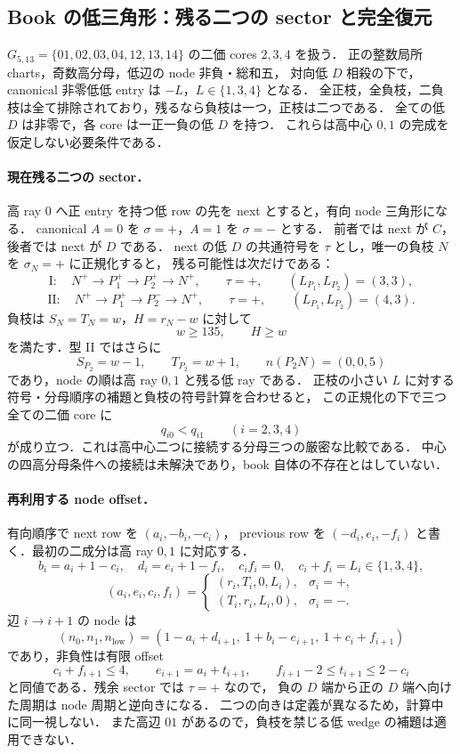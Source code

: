 \subsection{Book の低三角形：残る二つの sector と完全復元}
\label{nb20:section}
\label{nb21:section}

$G_{5,13}=\{01,02,03,04,12,13,14\}$ の二価 cores $2,3,4$ を扱う．
正の整数局所 charts，奇数高分母，低辺の node 非負・総和五，
対向低 $D$ 相殺の下で，canonical 非零低低 entry は $-L$，$L\in\{1,3,4\}$ となる．
全正枝，全負枝，二負枝は全て排除されており，残るなら負枝は一つ，正枝は二つである．
全ての低 $D$ は非零で，各 core は一正一負の低 $D$ を持つ．
これらは高中心 $0,1$ の完成を仮定しない必要条件である．

\paragraph{現在残る二つの sector．}
高 ray $0$ へ正 entry を持つ低 row の先を next とすると，有向 node 三角形になる．
canonical $A=0$ を $\sigma=+$，$A=1$ を $\sigma=-$ とする．
前者では next が $C$，後者では next が $D$ である．
next の低 $D$ の共通符号を $\tau$ とし，唯一の負枝 $N$ を $\sigma_N=+$ に正規化すると，
残る可能性は次だけである：
\[
 \mathrm I:\quad N^+\to P_1^+\to P_2^+\to N^+,
 \qquad \tau=+,\qquad (L_{P_1},L_{P_2})=(3,3),
\]
\[
 \mathrm {II}:\quad N^+\to P_1^+\to P_2^-\to N^+,
 \qquad \tau=+,\qquad (L_{P_1},L_{P_2})=(4,3).
\]
負枝は $S_N=T_N=w$，$H=r_N-w$ に対して
\[
 w\ge135,\qquad H\ge w
\]
を満たす．型 II ではさらに
\[
 S_{P_2}=w-1,\qquad T_{P_2}=w+1,
 \qquad n(P_2N)=(0,0,5)
\]
であり，node の順は高 ray $0,1$ と残る低 ray である．
正枝の小さい $L$ に対する符号・分母順序の補題と負枝の符号計算を合わせると，
この正規化の下で三つ全ての二価 core に
\[
 q_{i0}<q_{i1}\qquad(i=2,3,4)
\]
が成り立つ．これは高中心二つに接続する分母三つの厳密な比較である．
中心の四高分母条件への接続は未解決であり，book 自体の不存在とはしていない．

\paragraph{再利用する node offset．}
有向順序で next row を $(a_i,-b_i,-c_i)$，
previous row を $(-d_i,e_i,-f_i)$ と書く．最初の二成分は高 ray $0,1$ に対応する．
\[
 b_i=a_i+1-c_i,\quad d_i=e_i+1-f_i,\quad
 c_if_i=0,\quad c_i+f_i=L_i\in\{1,3,4\},
\]
\[
 (a_i,e_i,c_i,f_i)=
 \begin{cases}
 (r_i,T_i,0,L_i),&\sigma_i=+,\\
 (T_i,r_i,L_i,0),&\sigma_i=-.
 \end{cases}
\]
辺 $i\to i+1$ の node は
\[
 (n_0,n_1,n_{\mathrm{low}})
 =(1-a_i+d_{i+1},\ 1+b_i-e_{i+1},\ 1+c_i+f_{i+1})
\]
であり，非負性は有限 offset
\[
 c_i+f_{i+1}\le4,\qquad e_{i+1}=a_i+t_{i+1},\qquad
 f_{i+1}-2\le t_{i+1}\le2-c_i
\]
と同値である．残余 sector では $\tau=+$ なので，
負の $D$ 端から正の $D$ 端へ向けた周期は node 周期と逆向きになる．
二つの向きは定義が異なるため，計算中に同一視しない．
また高辺 $01$ があるので，負枝を禁じる低 wedge の補題は適用できない．

